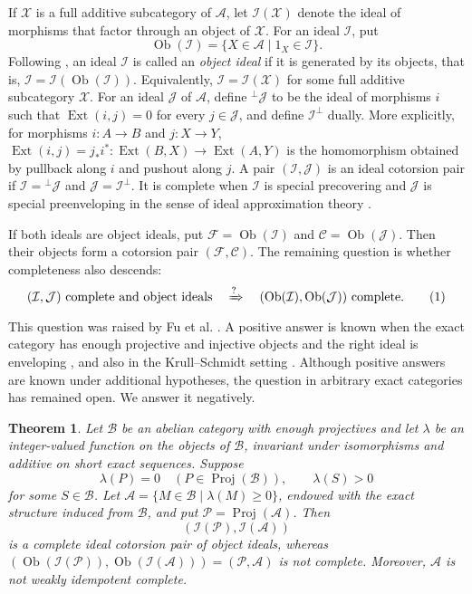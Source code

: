 \documentclass[10pt]{article}
\newtheorem{theorem}{Theorem}
\theoremstyle{remark}\newtheorem{remark}[theorem]{Remark}
\newcommand{\Ob}{\operatorname{Ob}}
\begin{document}
If \(\mathcal X\) is a full additive subcategory of \(\mathcal A\), let \(\mathcal I(\mathcal X)\) denote the ideal of morphisms that factor through an object of \(\mathcal X\).  
For an ideal \(\mathcal I\), put
\[
  \operatorname{Ob}(\mathcal I)
  =\{X\in\mathcal A\mid 1_X\in\mathcal I\}.
\]
Following \citep{FGHT2013}, an ideal \(\mathcal I\) is called an \emph{object ideal} if it is generated by its objects, that is,
$\mathcal I=\mathcal I(\operatorname{Ob}(\mathcal I)).$
Equivalently, \(\mathcal I=\mathcal I(\mathcal X)\) for some full additive subcategory \(\mathcal X\).
For an ideal \(\mathcal J\) of \(\mathcal A\), define
\({}^{\perp}\mathcal J\) to be the ideal of morphisms \(i\) such that
\(\operatorname{Ext}(i,j)=0\) for every \(j\in\mathcal J\), and define
\(\mathcal I^{\perp}\) dually. More explicitly, for morphisms
\(i:A\to B\) and \(j:X\to Y\), $\operatorname{Ext}(i,j)=j_*i^*: \operatorname{Ext}(B,X)\longrightarrow\operatorname{Ext}(A,Y)$ is the homomorphism obtained by pullback along \(i\) and pushout along
\(j\).  
A pair \((\mathcal I,\mathcal J)\) is an ideal cotorsion pair if \(\mathcal I={} ^{\perp}\mathcal J\) and
\(\mathcal J=\mathcal I^{\perp}\).  
It is complete when \(\mathcal I\) is special precovering and \(\mathcal J\) is special preenveloping in the sense of ideal approximation theory \citep{FGHT2013}.

If both ideals are object ideals, put \(\mathcal F=\Ob(\mathcal I)\) and \(\mathcal C=\Ob(\mathcal J)\).
Then their objects form a cotorsion pair $(\mathcal{F},\mathcal{C})$.
The remaining question is whether completeness also descends:
\[
 (\mathcal I,\mathcal J)\text{ complete and object ideals}
 \quad\xRightarrow{?}\quad
 (\Ob(\mathcal I),\Ob(\mathcal J))\text{ complete}.       \tag{1}
\]
This question  was raised by Fu et al. \citep[Question 29]{FGHT2013}.  
A positive answer is known when the exact category has enough projective and injective objects and the right ideal is enveloping \citep{SWZ2024}, and also in the Krull–Schmidt setting \citep{ZZ2026}. 
Although positive answers are known under additional hypotheses, the question in arbitrary exact categories has remained open.  
We answer it negatively.

 
\begin{theorem}\label{thm:main}
Let \(\mathcal B\) be an abelian category with enough projectives and let
\(\lambda\) be an integer-valued function on the objects of \(\mathcal B\),
invariant under isomorphisms and additive on short exact sequences. Suppose
\[
 \lambda(P)=0\quad(P\in\operatorname{Proj}(\mathcal B)),
 \qquad \lambda(S)>0
\]
for some \(S\in\mathcal B\). Let
\(\mathcal A=\{M\in\mathcal B\mid\lambda(M)\geq0\}\), endowed with the
exact structure induced from \(\mathcal B\), and put
\(\mathcal P=\operatorname{Proj}(\mathcal A)\). Then
\[
 (\mathcal I(\mathcal P),\mathcal I(\mathcal A))
\]
is a complete ideal cotorsion pair of object ideals, whereas
\((\Ob(\mathcal I(\mathcal P)),\Ob(\mathcal I(\mathcal A)))
=(\mathcal P,\mathcal A)\) is not complete.  Moreover,
\(\mathcal A\) is not weakly idempotent complete.
\end{theorem}
\end{document}
